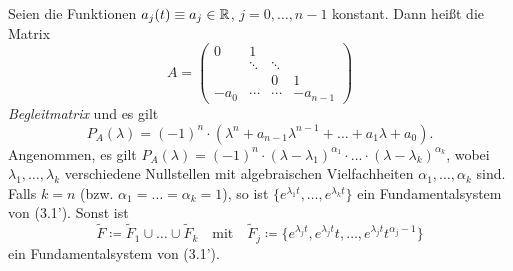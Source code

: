 \documentclass{cheat-sheet}
\begin{document}
\begin{bem}
  Seien die Funktionen $a_j(t) \equiv a_j \in \mathbb{R}$, $j = 0, \ldots, n-1$ konstant. Dann heißt die Matrix
  \[
    A = \begin{pmatrix}
      0 & 1 && \\
      & \ddots & \ddots & \\
      && 0 & 1\\
      - a_0 & \cdots & \cdots & -a_{n-1}
    \end{pmatrix}
  \]
  \emph{Begleitmatrix} und es gilt
  \[ P_A(\lambda) = (-1)^n \cdot (\lambda^n + a_{n-1} \lambda^{n-1} + \ldots + a_1 \lambda + a_0). \]
  Angenommen, es gilt $P_A(\lambda) = (-1)^n \cdot (\lambda - \lambda_1)^{\alpha_1} \cdot \ldots \cdot (\lambda - \lambda_k)^{\alpha_k}$, wobei $\lambda_1, \ldots, \lambda_k$ verschiedene Nullstellen mit algebraischen Vielfachheiten $\alpha_1, \ldots, \alpha_k$ sind.
  Falls $k = n$ (bzw. $\alpha_1 = \ldots = \alpha_k = 1$), so ist $\{ e^{\lambda_1 t}, \ldots, e^{\lambda_k t} \}$ ein Fundamentalsystem von (3.1'). Sonst ist
  \[
    \tilde{F} \coloneqq \tilde{F}_1 \cup \ldots \cup \tilde{F}_k
    \quad \text{mit} \quad
    \tilde{F}_j \coloneqq \{ e^{\lambda_j t}, e^{\lambda_j t} t, \ldots, e^{\lambda_j t} t^{\alpha_j - 1} \}
  \]
  ein Fundamentalsystem von (3.1').
\end{bem}

\end{document}
